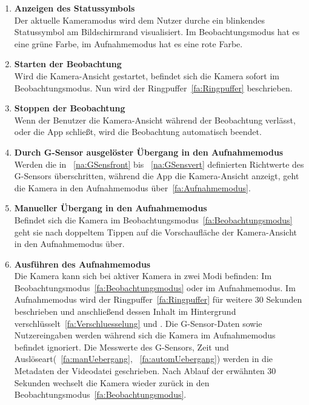 \begin{enumerate}
\item \label{fa:Statussymbol}\textbf{Anzeigen des Statussymbols} \hfill \\
Der aktuelle Kameramodus wird dem Nutzer durche ein blinkendes Statussymbol am Bildschirmrand visualisiert. Im Beobachtungsmodus hat es eine grüne Farbe, im Aufnahmemodus hat es eine rote Farbe.

\item \label{fa:camStart}\textbf{Starten der Beobachtung} \hfill \\
Wird die Kamera-Ansicht gestartet, befindet sich die Kamera sofort im Beobachtungsmodus. Nun wird der \gls{Ringpuffer}~\eqref{fa:Ringpuffer} beschrieben.

\item \textbf{Stoppen der Beobachtung} \hfill \\
Wenn der Benutzer die Kamera-Ansicht während der Beobachtung verlässt, oder die \gls{App} schließt, wird die Beobachtung automatisch beendet.

\item \label{fa:automUebergang}\textbf{Durch \gls{G-Sensor} ausgelöster Übergang in den Aufnahmemodus} \hfill \\
Werden die in ~\eqref{na:GSensfront} bis ~\eqref{na:GSensvert} definierten Richtwerte des G-Sensors überschritten, während die \gls{App} die Kamera-Ansicht anzeigt, geht die Kamera in den Aufnahmemodus über~\eqref{fa:Aufnahmemodus}. 

\item \label{fa:manUebergang}\textbf{Manueller Übergang in den Aufnahmemodus} \hfill \\
Befindet sich die Kamera im Beobachtungsmodus~\eqref{fa:Beobachtungsmodus} geht sie nach doppeltem Tippen auf die Vorschaufläche der Kamera-Ansicht in den Aufnahmemodus über.

\item \label{fa:Aufnahmemodus}\textbf{Ausführen des Aufnahmemodus} \hfill \\
Die Kamera kann sich bei aktiver Kamera in zwei Modi befinden: Im Beobachtungsmodus~\eqref{fa:Beobachtungsmodus} oder im Aufnahmemodus.
Im Aufnahmemodus wird der \gls{Ringpuffer}~\eqref{fa:Ringpuffer} für weitere 30 Sekunden beschrieben und anschließend dessen Inhalt im Hintergrund verschlüsselt~\eqref{fa:Verschluesselung} und . Die \gls{G-Sensor}-Daten sowie Nutzereingaben werden während sich die Kamera im Aufnahmemodus befindet ignoriert. Die Messwerte des G-Sensors, Zeit und Auslöseart(~\eqref{fa:manUebergang}, ~\eqref{fa:automUebergang}) werden in die \gls{Metadaten} der Videodatei geschrieben. Nach Ablauf der erwähnten 30 Sekunden wechselt die Kamera wieder zurück in den Beobachtungsmodus~\eqref{fa:Beobachtungsmodus}.


\end{enumerate}
